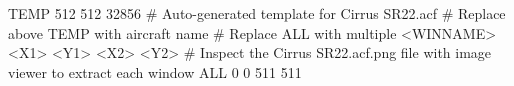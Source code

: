 TEMP 512 512 32856
# Auto-generated template for Cirrus SR22.acf
# Replace above TEMP with aircraft name
# Replace ALL with multiple <WINNAME> <X1> <Y1> <X2> <Y2>
# Inspect the Cirrus SR22.acf.png file with image viewer to extract each window
ALL 0 0 511 511
